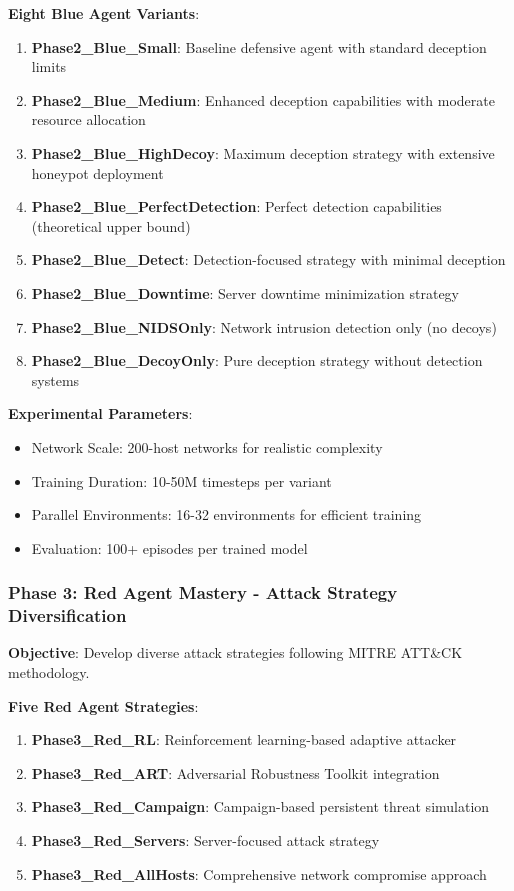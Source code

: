 \documentclass[11pt]{article}
\theoremstyle{definition}
\theoremstyle{plain}
\begin{document}
\textbf{Eight Blue Agent Variants}:
\begin{enumerate}
\item \textbf{Phase2\_Blue\_Small}: Baseline defensive agent with standard deception limits
\item \textbf{Phase2\_Blue\_Medium}: Enhanced deception capabilities with moderate resource allocation
\item \textbf{Phase2\_Blue\_HighDecoy}: Maximum deception strategy with extensive honeypot deployment
\item \textbf{Phase2\_Blue\_PerfectDetection}: Perfect detection capabilities (theoretical upper bound)
\item \textbf{Phase2\_Blue\_Detect}: Detection-focused strategy with minimal deception
\item \textbf{Phase2\_Blue\_Downtime}: Server downtime minimization strategy
\item \textbf{Phase2\_Blue\_NIDSOnly}: Network intrusion detection only (no decoys)
\item \textbf{Phase2\_Blue\_DecoyOnly}: Pure deception strategy without detection systems
\end{enumerate}

\textbf{Experimental Parameters}:
\begin{itemize}
\item Network Scale: 200-host networks for realistic complexity
\item Training Duration: 10-50M timesteps per variant
\item Parallel Environments: 16-32 environments for efficient training
\item Evaluation: 100+ episodes per trained model
\end{itemize}

\subsubsection{Phase 3: Red Agent Mastery - Attack Strategy Diversification}
\textbf{Objective}: Develop diverse attack strategies following MITRE ATT\&CK methodology.

\textbf{Five Red Agent Strategies}:
\begin{enumerate}
\item \textbf{Phase3\_Red\_RL}: Reinforcement learning-based adaptive attacker
\item \textbf{Phase3\_Red\_ART}: Adversarial Robustness Toolkit integration
\item \textbf{Phase3\_Red\_Campaign}: Campaign-based persistent threat simulation
\item \textbf{Phase3\_Red\_Servers}: Server-focused attack strategy
\item \textbf{Phase3\_Red\_AllHosts}: Comprehensive network compromise approach
\end{enumerate}
\end{document}
